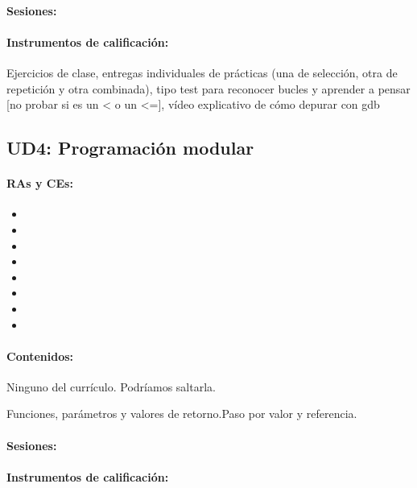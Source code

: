 	\paragraph{Sesiones:}

	\paragraph{Instrumentos de calificación:}
		Ejercicios de clase, entregas individuales de prácticas (una de selección, otra de repetición y otra combinada), tipo test para reconocer bucles y aprender a pensar [no probar si es un < o un <=], vídeo explicativo de cómo depurar con gdb



\newpage
\subsection{UD4: Programación modular}
	\paragraph{RAs y CEs:}
	\begin{itemize}[itemsep=0.1em, topsep=0.1em]
		\item\RAUNOf
		\item\RAUNOi			
		\item\RATRESe
		\item\RATRESf
		\item\RATRESg 
		\item\RACINCOa
		\item\RACINCOb
		\item\RACINCOc			
	\end{itemize}

	\paragraph{Contenidos:}
		Ninguno del currículo. Podríamos saltarla.

		Funciones, parámetros y valores de retorno.Paso por valor y referencia.


	\paragraph{Sesiones:}
	
	\paragraph{Instrumentos de calificación:}


